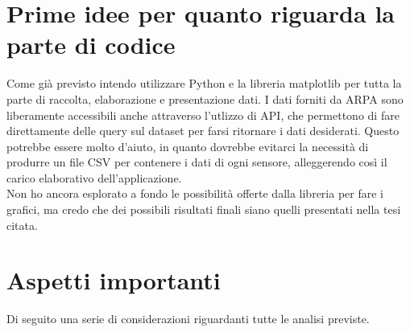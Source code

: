 \documentclass{article}
\begin{document}
\section{Prime idee per quanto riguarda la parte di codice}
Come già previsto intendo utilizzare Python e la libreria matplotlib per tutta la parte di raccolta, elaborazione e presentazione dati. I dati forniti da ARPA sono liberamente accessibili anche attraverso l'utlizzo di API, che permettono di fare direttamente delle query sul dataset per farsi ritornare i dati desiderati. Questo potrebbe essere molto d'aiuto, in quanto dovrebbe evitarci la necessità di produrre un file CSV per contenere i dati di ogni sensore, alleggerendo così il carico elaborativo dell'applicazione.
\\Non ho ancora esplorato a fondo le possibilità offerte dalla libreria per fare i grafici, ma credo che dei possibili risultati finali siano quelli presentati nella tesi citata\cite{scolari2017evoluzione}.
\newpage

\section{Aspetti importanti}
Di seguito una serie di considerazioni riguardanti tutte le analisi previste.
\end{document}
